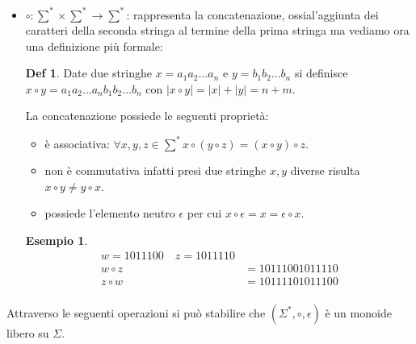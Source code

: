 \documentclass[a4paper]{book}
\theoremstyle{definition}%
\newtheorem*{defi}{Def}%
\newtheorem*{esempio}{Esempio}
\begin{document}
\begin{itemize}
  \item $\circ: \sum ^ * \times \sum ^ * \to \sum ^ *$: rappresenta la concatenazione, ossial'aggiunta dei caratteri della seconda stringa
        al termine della prima stringa ma vediamo ora una definizione più formale:
        \begin{defi}
          Date due stringhe $x = a_1 a_2 \dots a_n$ e $y = b_1 b_2 \dots b_n$ si definisce $x \circ y = a_1 a_2 \dots a_n b_1 b_2 \dots b_n$
          con $|x \circ y| = |x| + |y| = n + m$.
        \end{defi}
        La concatenazione possiede le seguenti proprietà:
        \begin{itemize}
        \item è associativa: $\forall x,y,z \in \sum^* x \circ (y \circ z) = (x \circ y) \circ z$.
        \item non è commutativa infatti presi due stringhe $x,y$ diverse risulta $x \circ y \neq y \circ x$.
        \item possiede l'elemento neutro $\epsilon$ per cui $x \circ \epsilon = x = \epsilon \circ x$.
        \end{itemize}
        \begin{esempio}
          \begin{equation*}
          \begin{split}
            w = 1011100 \quad z = 1011110  \\
          w \circ z & = 10111001011110 \\
          z \circ w  &= 10111101011100 \\
          \end{split}
          \end{equation*}
        \end{esempio}
  \end{itemize}
Attraverso le seguenti operazioni si può stabilire che $(\Sigma ^ *,\circ,\epsilon)$ è un monoide libero su $\Sigma$.
\end{document}
